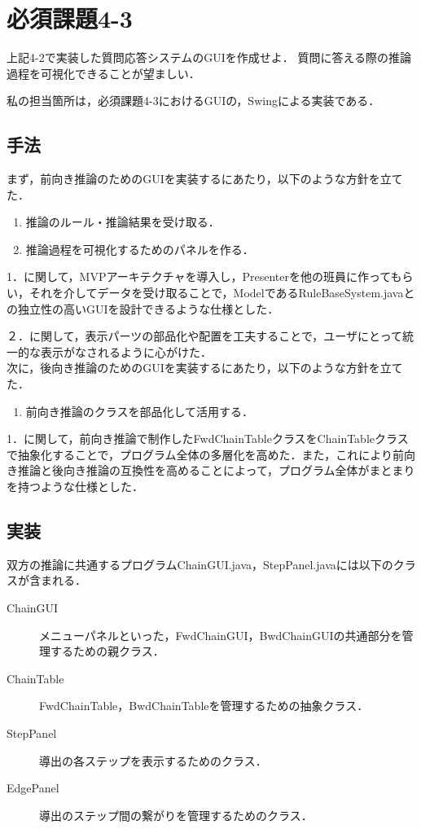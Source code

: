\documentclass[12pt]{jarticle}
\begin{document}
\section{必須課題4-3}
\begin{screen}
上記4-2で実装した質問応答システムのGUIを作成せよ．
質問に答える際の推論過程を可視化できることが望ましい．
\end{screen}
私の担当箇所は，必須課題4-3におけるGUIの，Swingによる実装である．

\subsection{手法}
まず，前向き推論のためのGUIを実装するにあたり，以下のような方針を立てた．
\begin{enumerate}
\item 推論のルール・推論結果を受け取る．
\item 推論過程を可視化するためのパネルを作る．
\end{enumerate}

1．に関して，MVPアーキテクチャを導入し，Presenterを他の班員に作ってもらい，それを介してデータを受け取ることで，ModelであるRuleBaseSystem.javaとの独立性の高いGUIを設計できるような仕様とした．

２．に関して，表示パーツの部品化や配置を工夫することで，ユーザにとって統一的な表示がなされるように心がけた． \\

次に，後向き推論のためのGUIを実装するにあたり，以下のような方針を立てた．
\begin{enumerate}
\item 前向き推論のクラスを部品化して活用する．
\end{enumerate}

1．に関して，前向き推論で制作したFwdChainTableクラスをChainTableクラスで抽象化することで，プログラム全体の多層化を高めた．また，これにより前向き推論と後向き推論の互換性を高めることによって，プログラム全体がまとまりを持つような仕様とした．

\subsection{実装}
双方の推論に共通するプログラムChainGUI.java，StepPanel.javaには以下のクラスが含まれる．
\begin{description}
\item[ChainGUI] メニューパネルといった，FwdChainGUI，BwdChainGUIの共通部分を管理するための親クラス．
\item[ChainTable] FwdChainTable，BwdChainTableを管理するための抽象クラス．
\item[StepPanel] 導出の各ステップを表示するためのクラス．
\item[EdgePanel] 導出のステップ間の繋がりを管理するためのクラス．
\end{description}
\end{document}
